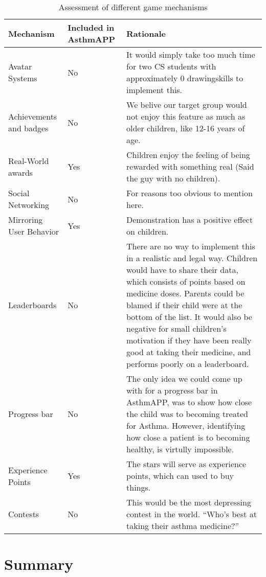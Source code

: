 \begin{table}[H]
\begin{tabular}{| p{3.0cm} | p{2.5cm} | p{8.0cm} | }
	\hline
	\textbf{Mechanism} & \textbf{Included in AsthmAPP} & \textbf{Rationale} \\
	\hline
	Avatar Systems & No & It would simply take too much time for two CS students with approximately 0 drawingskills to implement this. \\
	\hline
	Achievements and badges & No & We belive our target group would not enjoy this feature as much as older children, like 12-16 years of age.  \\
	\hline 
	Real-World awards & Yes & Children enjoy the feeling of being rewarded with something real (Said the guy with no children). \\
	\hline
	Social Networking & No & For reasons too obvious to mention here. \\
	\hline
	Mirroring User Behavior & Yes & Demonstration has a positive effect on children.
	\\
	\hline
	Leaderboards & No & There are no way to implement this in a realistic and legal way. Children would have to share their data, which consists of points based on medicine doses. Parents could be blamed if their child were at the bottom of the list. It would also be negative for small children's motivation if they have been really good at taking their medicine, and performs poorly on a leaderboard. 
	\\
	\hline
	Progress bar & No & The only idea we could come up with for a progress bar in AsthmAPP, was to show how close the child was to becoming treated for Asthma. However, identifying how close a patient is to becoming healthy, is virtully impossible. 
	\\
	\hline
	Experience Points & Yes & The stars will serve as experience points, which can used to buy things. 
	\\
	\hline
	Contests & No & This would be the most depressing contest in the world. ``Who's best at taking their asthma medicine?''   
	\\
	\hline
\end{tabular}
\caption{Assessment of different game mechanisms}
\label{tab:game-mech-in-astmapp}
\end{table}




\section{Summary}
\label{sec:gamificationinapp}

